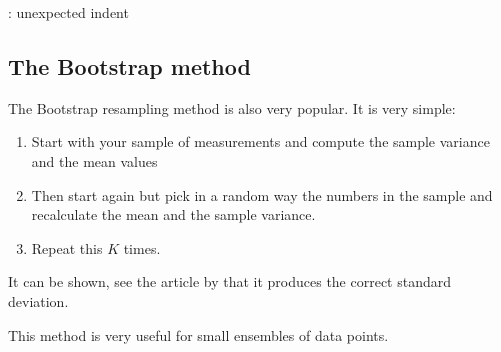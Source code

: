 \documentclass[letterpaper,10pt,english]{sphinxmanual}
\begin{document}
\begin{sphinxVerbatim}[commandchars=\\\{\}]
          \PYG{p}{[}\PYG{p}{]}
          \PYG{p}{[}\PYG{p}{]}
          
\end{sphinxVerbatim}

\begin{sphinxVerbatim}[commandchars=\\\{\}]
: unexpected indent
\end{sphinxVerbatim}


\subsection{The Bootstrap method}
\label{\detokenize{chapter2:the-bootstrap-method}}
The Bootstrap  resampling method is also very popular. It is very simple:
\begin{enumerate}
%
\item {} 
Start with your sample of measurements and compute the sample variance and the mean values

\item {} 
Then start again but pick in a random way the numbers in the sample and recalculate the mean and the sample variance.

\item {} 
Repeat this \(K\) times.

\end{enumerate}

It can be shown, see the article by 
that it produces the correct standard deviation.

This method is very useful for small ensembles of data points.
\end{document}
